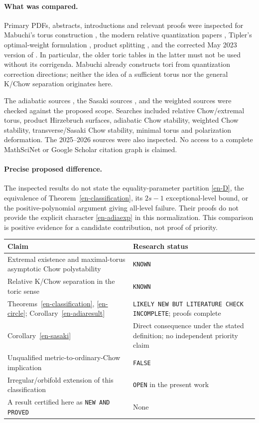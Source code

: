 \documentclass[12pt]{amsart}
\theoremstyle{definition}
\theoremstyle{remark}
\numberwithin{equation}{section}
\begin{document}
\paragraph{What was compared.}
Primary PDFs, abstracts, introductions and relevant proofs were inspected for Mabuchi's torus construction \cite{en-Mab04}, the modern relative quantization papers \cite{en-Mab16,en-Sey,en-ST,en-Has17}, Tipler's optimal-weight formulation \cite{en-Tip}, product splitting \cite{en-AH}, and the corrected May 2023 version of \cite{en-YZ}. In particular, the older toric tables in the latter must not be used without its corrigenda. Mabuchi already constructs tori from quantization correction directions; neither the idea of a sufficient torus nor the general K/Chow separation originates here.

The adiabatic sources \cite{en-DS19,en-DS20,en-Hal20,en-Hat}, the Sasaki sources \cite{en-CS,en-BvC}, and the weighted sources \cite{en-Lah,en-Hal23,en-AJL,en-Has25} were checked against the proposed scope. Searches included relative Chow/extremal torus, product Hirzebruch surfaces, adiabatic Chow stability, weighted Chow stability, transverse/Sasaki Chow stability, minimal torus and polarization deformation. The 2025--2026 sources \cite{en-BJ25,en-Tru26,en-LY26,en-Jub26} were also inspected. No access to a complete MathSciNet or Google Scholar citation graph is claimed.

\paragraph{Precise proposed difference.}
The inspected results do not state the equality-parameter partition \eqref{en-D}, the equivalence of Theorem~\ref{en-classification}, its $2s-1$ exceptional-level bound, or the positive-polynomial argument giving all-level failure. Their proofs do not provide the explicit character \eqref{en-adiaexp} in this normalization. This comparison is positive evidence for a candidate contribution, not proof of priority.

\begingroup\small
\begin{longtable}{p{}p{}}
\hline
Claim & Research status\\ \hline
Extremal existence and maximal-torus asymptotic Chow polystability & \texttt{KNOWN}\\
Relative K/Chow separation in the toric sense & \texttt{KNOWN}\\
Theorems~\ref{en-classification}, \ref{en-circle}; Corollary~\ref{en-adiaresult} & \texttt{LIKELY NEW BUT LITERATURE CHECK INCOMPLETE}; proofs complete\\
Corollary~\ref{en-sasaki} & Direct consequence under the stated definition; no independent priority claim\\
Unqualified metric-to-ordinary-Chow implication & \texttt{FALSE}\\
Irregular/orbifold extension of this classification & \texttt{OPEN} in the present work\\
A result certified here as \texttt{NEW AND PROVED} & None\\ \hline
\end{longtable}
\endgroup
\end{document}
